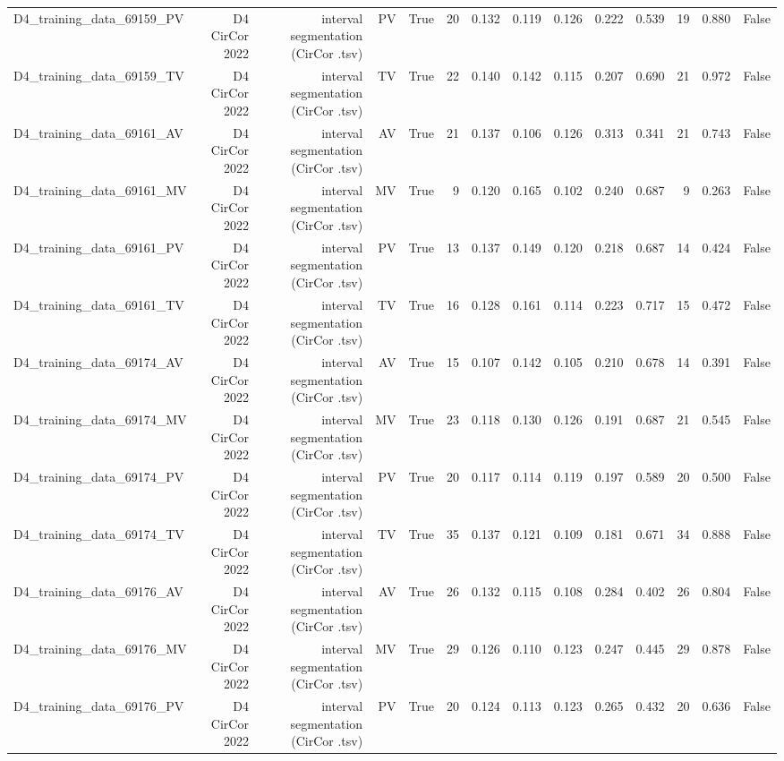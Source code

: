 \begin{table}[htbp]
\begin{tabular}{lrrrrrrrrrrrrr}
    D4\_training\_data\_69159\_PV & D4 CirCor 2022 & interval segmentation (CirCor .tsv) & PV & True & 20 & 0.132 & 0.119 & 0.126 & 0.222 & 0.539 & 19 & 0.880 & False \\
    D4\_training\_data\_69159\_TV & D4 CirCor 2022 & interval segmentation (CirCor .tsv) & TV & True & 22 & 0.140 & 0.142 & 0.115 & 0.207 & 0.690 & 21 & 0.972 & False \\
    D4\_training\_data\_69161\_AV & D4 CirCor 2022 & interval segmentation (CirCor .tsv) & AV & True & 21 & 0.137 & 0.106 & 0.126 & 0.313 & 0.341 & 21 & 0.743 & False \\
    D4\_training\_data\_69161\_MV & D4 CirCor 2022 & interval segmentation (CirCor .tsv) & MV & True & 9 & 0.120 & 0.165 & 0.102 & 0.240 & 0.687 & 9 & 0.263 & False \\
    D4\_training\_data\_69161\_PV & D4 CirCor 2022 & interval segmentation (CirCor .tsv) & PV & True & 13 & 0.137 & 0.149 & 0.120 & 0.218 & 0.687 & 14 & 0.424 & False \\
    D4\_training\_data\_69161\_TV & D4 CirCor 2022 & interval segmentation (CirCor .tsv) & TV & True & 16 & 0.128 & 0.161 & 0.114 & 0.223 & 0.717 & 15 & 0.472 & False \\
    D4\_training\_data\_69174\_AV & D4 CirCor 2022 & interval segmentation (CirCor .tsv) & AV & True & 15 & 0.107 & 0.142 & 0.105 & 0.210 & 0.678 & 14 & 0.391 & False \\
    D4\_training\_data\_69174\_MV & D4 CirCor 2022 & interval segmentation (CirCor .tsv) & MV & True & 23 & 0.118 & 0.130 & 0.126 & 0.191 & 0.687 & 21 & 0.545 & False \\
    D4\_training\_data\_69174\_PV & D4 CirCor 2022 & interval segmentation (CirCor .tsv) & PV & True & 20 & 0.117 & 0.114 & 0.119 & 0.197 & 0.589 & 20 & 0.500 & False \\
    D4\_training\_data\_69174\_TV & D4 CirCor 2022 & interval segmentation (CirCor .tsv) & TV & True & 35 & 0.137 & 0.121 & 0.109 & 0.181 & 0.671 & 34 & 0.888 & False \\
    D4\_training\_data\_69176\_AV & D4 CirCor 2022 & interval segmentation (CirCor .tsv) & AV & True & 26 & 0.132 & 0.115 & 0.108 & 0.284 & 0.402 & 26 & 0.804 & False \\
    D4\_training\_data\_69176\_MV & D4 CirCor 2022 & interval segmentation (CirCor .tsv) & MV & True & 29 & 0.126 & 0.110 & 0.123 & 0.247 & 0.445 & 29 & 0.878 & False \\
    D4\_training\_data\_69176\_PV & D4 CirCor 2022 & interval segmentation (CirCor .tsv) & PV & True & 20 & 0.124 & 0.113 & 0.123 & 0.265 & 0.432 & 20 & 0.636 & False \\

\end{tabular}
\end{table}
